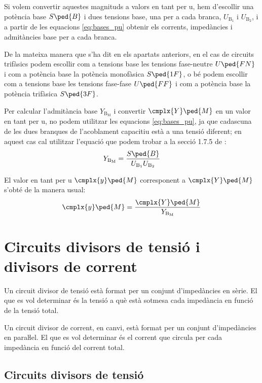 Si volem convertir aquestes magnituds a valors en tant per u, hem d'escollir  una potència base $S\ped{B}$ i dues tensions base, una  per a cada branca, $U_{\text{B}_1}$ i  $U_{\text{B}_2}$, i a partir de les equacions \eqref{eq:bases_pu} obtenir els corrents, impedàncies i admitàncies base per a cada branca.

De la mateixa manera que s'ha dit en els apartats anteriors, en el cas de circuits trifàsics podem escollir com a tensions base les tensions fase-neutre $U\ped{FN}$ i com a potència base la potència  monofàsica $S\ped{1F}$, o bé podem escollir com a tensions base les tensions fase-fase $U\ped{FF}$ i com a potència base la potència trifàsica $S\ped{3F}$.


Per  calcular l'admitància base $Y_{\text{B}_\text{M}}$ i convertir $\cmplx{Y}\ped{M}$ en un valor en tant per u, no podem utilitzar les equacions \eqref{eq:bases_pu}, ja que cadascuna de les dues branques de l'acoblament capacitiu està a una tensió diferent; en aquest cas cal utilitzar l'equació que podem trobar a la secció 1.7.5 de \cite{TLE}:
\begin{equation}
    Y_{\text{B}_\text{M}} = \frac{S\ped{B}}{U_{\text{B}_1} U_{\text{B}_2}}
\end{equation}

El valor en tant per u $\cmplx{y}\ped{M}$ corresponent a $\cmplx{Y}\ped{M}$ s'obté de la manera usual:
\begin{equation}
    \cmplx{y}\ped{M} = \frac{\cmplx{Y}\ped{M}}{Y_{\text{B}_\text{M}}}
\end{equation}


\section{Circuits divisors de tensió i divisors de corrent}\label{sec:div_tens_corr}

Un circuit divisor de tensió està format per un conjunt
d'impedàncies en sèrie. El que es vol determinar  és  la
tensió a què està sotmesa cada impedància en funció de la tensió total.

Un circuit divisor de corrent, en canvi, està format per un conjunt
d'impedàncies en paraŀlel. El que es vol determinar és el
corrent que circula per cada impedància en funció del corrent
total.

\subsection{Circuits divisors de tensió}\label{sec:circ-div-tens}


